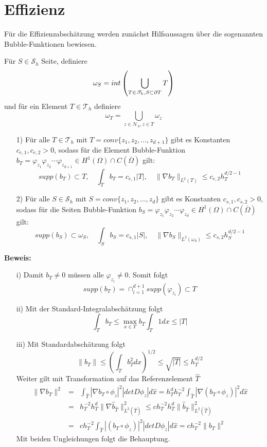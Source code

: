 \section{Effizienz}
Für die Effizienzabschätzung werden zunächst Hilfsaussagen über die sogenannten Bubble-Funktionen bewiesen.
\begin{definition}
	Für $S \in \mathscr{S}_h$ Seite, definiere 
	\[
		\omega_S= int\left(\bigcup_{T\in\mathscr{T}_h,S\subset \partial T}T\right)
    \]
    und für ein Element $T \in \mathscr{T}_h$ definiere
    \[
    \omega_T = \bigcup_{z\in\mathscr{N}_h,z\in T} \omega_z
    \]
\end{definition}
\begin{lemma}
	\leavevmode
	\begin{itemize}
		\item[1)]
		Für alle $T\in\mathscr{T}_h$ mit $T =conv\{z_1,z_2,...,z_{d+1}\}$ gibt es Konstanten $c_{e,1},c_{e,2}>0$,  sodass für die \textsf{Element Bubble-Funktion} $b_T = \varphi_{z_1}\varphi_{z_2}\cdots\varphi_{z_{d+1}} \in H^1(\Omega)\cap C(\overline{\Omega})$ gilt:
		\[
		supp(b_T)\subset T,\quad \int_{T} b_T =c_{e,1} |T|, \quad \|\nabla b_T\|_{L^2(T)} \leq c_{e,2}h_T^{d/2-1}
		\]
		\item[2)]
		Für alle $S\in\mathscr{S}_h$ mit $S =conv\{z_1,z_2,...,z_{d}\}$ gibt es Konstanten $c_{s,1},c_{s,2}>0$,  sodass für die \textsf{Seiten Bubble-Funktion} $b_S = \varphi_{z_1}\varphi_{z_2}\cdots\varphi_{z_{d}} \in H^1(\Omega)\cap C(\overline{\Omega})$ gilt:
		\[
		supp(b_S)\subset \omega_S,\quad \int_{S} b_S =c_{s,1} |S|, \quad \|\nabla b_S\|_{L^2(\omega_S)} \leq c_{s,2}h_S^{d/2-1}
		\]
	\end{itemize}
\end{lemma}
\textbf{Beweis:}
\begin{itemize}
	\item[i)] Damit $b_T\neq0$ müssen alle $\varphi_{z_{i}}\neq 0$. Somit folgt\[
	supp(b_T) = \cap_{i=1}^{d+1}supp(\varphi_{z_i})\subset T
	\]
	\item[ii)] Mit der Standard-Integralabschätzung folgt \[
	\int_{T}b_T \leq \max_{x\in T}b_T \int_{T}1 dx \leq |T|
	\]
	\item[iii)] Mit Standardabschätzung folgt \[
	\|b_T\| \leq \left(\int_{T}b_T^2dx\right)^{1/2} \leq \sqrt{|T|}\leq h_T^{d/2}
	\] Weiter gilt mit Transformation auf das Referenzelement $\hat{T}$
	\begin{eqnarray*}
		\|\nabla b_T\|^2 &=& \int_{\hat{T}} |\nabla b_{T}\circ \phi_z|^2 | detD\phi_z|d\hat{x} = h_T^dh^{-2}_T\int_{\hat{T}} |\nabla (b_T\circ \phi_z)|^2 d\hat{x} \\
		&=& h^{-2}_T h_T^d\| \nabla \widehat{b}_{\hat{T}}\|_{L^2(\hat{T})}^2 \leq c h^{-2}_T h_T^d \|\widehat{b}_{\hat{T}}\|_{L^2(\hat{T})}^2 \\
		&=& ch^{-2}_T\int_{\hat{T}} | (b_T\circ \phi_z)|^2 | detD\phi_z| d\hat{x}= ch^{-2}_T \| b_T\|^2
	\end{eqnarray*}
	Mit beiden Ungleichungen folgt die Behauptung.
\end{itemize}
